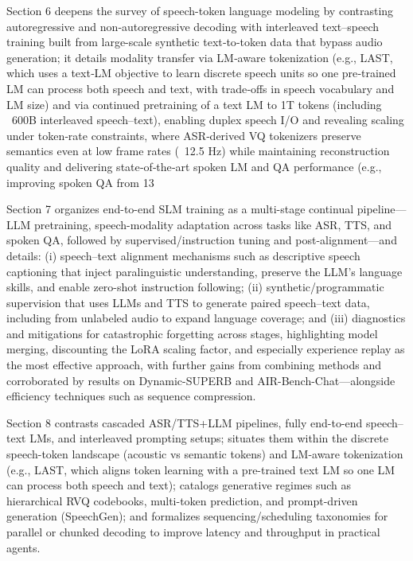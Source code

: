Section 6 deepens the survey of speech-token language modeling by contrasting autoregressive and non‑autoregressive decoding with interleaved text–speech training built from large-scale synthetic text‑to‑token data that bypass audio generation; it details modality transfer via LM‑aware tokenization (e.g., LAST, which uses a text‑LM objective to learn discrete speech units so one pre‑trained LM can process both speech and text, with trade‑offs in speech vocabulary and LM size) and via continued pretraining of a text LM to 1T tokens (including ~600B interleaved speech–text), enabling duplex speech I/O and revealing scaling under token‑rate constraints, where ASR‑derived VQ tokenizers preserve semantics even at low frame rates (~12.5 Hz) while maintaining reconstruction quality and delivering state‑of‑the‑art spoken LM and QA performance (e.g., improving spoken QA from 13%



Section 7 organizes end-to-end SLM training as a multi-stage continual pipeline—LLM pretraining, speech-modality adaptation across tasks like ASR, TTS, and spoken QA, followed by supervised/instruction tuning and post-alignment—and details: (i) speech–text alignment mechanisms such as descriptive speech captioning that inject paralinguistic understanding, preserve the LLM’s language skills, and enable zero-shot instruction following; (ii) synthetic/programmatic supervision that uses LLMs and TTS to generate paired speech–text data, including from unlabeled audio to expand language coverage; and (iii) diagnostics and mitigations for catastrophic forgetting across stages, highlighting model merging, discounting the LoRA scaling factor, and especially experience replay as the most effective approach, with further gains from combining methods and corroborated by results on Dynamic-SUPERB and AIR-Bench-Chat—alongside efficiency techniques such as sequence compression. \cite{noroozi2024instructiondatagenerationunsupervisedada,hsiao2025analyzingmitigationstrategiescatastrophi,lu2024destaenhancingspeechlanguagemodelsthroug,lu2025desta2developinginstructionfollowingspee} 



Section 8 contrasts cascaded ASR/TTS+LLM pipelines, fully end-to-end speech–text LMs, and interleaved prompting setups; situates them within the discrete speech-token landscape (acoustic vs semantic tokens) and LM-aware tokenization (e.g., LAST, which aligns token learning with a pre-trained text LM so one LM can process both speech and text); catalogs generative regimes such as hierarchical RVQ codebooks, multi-token prediction, and prompt-driven generation (SpeechGen); and formalizes sequencing/scheduling taxonomies for parallel or chunked decoding to improve latency and throughput in practical agents. \cite{turetzky2024lastlanguagemodelawarespeechtokenization,wu2023speechgenunlockinggenerativepowerspeechl,guo2025recentadvancesdiscretespeechtokensreview} 



